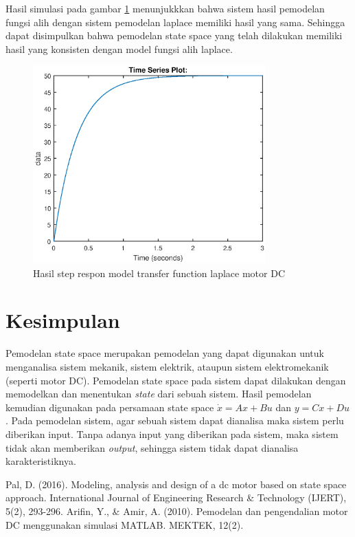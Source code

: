 \documentclass[../cover.tex]{subfiles}
\begin{document}
            Hasil simulasi pada gambar \ref{gambar_9} menunjukkkan bahwa sistem hasil pemodelan fungsi alih dengan sistem pemodelan laplace memiliki hasil yang sama. Sehingga dapat disimpulkan bahwa pemodelan state space yang telah dilakukan memiliki hasil yang konsisten dengan model fungsi alih laplace.
            \begin{figure}[H]
                \centering
                \includegraphics[width = 0.8\textwidth]{assets/image/TRANSFER_FUNCTION_MOTOR_DC.eps}
                \caption{Hasil step respon model transfer function laplace motor DC}
                \label{gambar_9}
            \end{figure}
            
\section{Kesimpulan}
    Pemodelan state space merupakan pemodelan yang dapat digunakan untuk menganalisa sistem mekanik, sistem elektrik, ataupun sistem elektromekanik (seperti motor DC). Pemodelan state space pada sistem dapat dilakukan dengan memodelkan dan menentukan \textit{state} dari sebuah sistem. Hasil pemodelan kemudian digunakan pada persamaan state space $\dot{x} = Ax+Bu$ dan $y = Cx + Du$. Pada pemodelan sistem, agar sebuah sistem dapat dianalisa maka sistem perlu diberikan input. Tanpa adanya input yang diberikan pada sistem, maka sistem tidak akan memberikan \textit{output}, sehingga sistem tidak dapat dianalisa karakteristiknya.
    
\begin{thebibliography}{2}
     Pal, D. (2016). Modeling, analysis and design of a dc motor based on state space approach. International Journal of Engineering Research \& Technology (IJERT), 5(2), 293-296.
     Arifin, Y., \& Amir, A. (2010). Pemodelan dan pengendalian motor DC menggunakan simulasi MATLAB. MEKTEK, 12(2).
\end{thebibliography}
\end{document}
